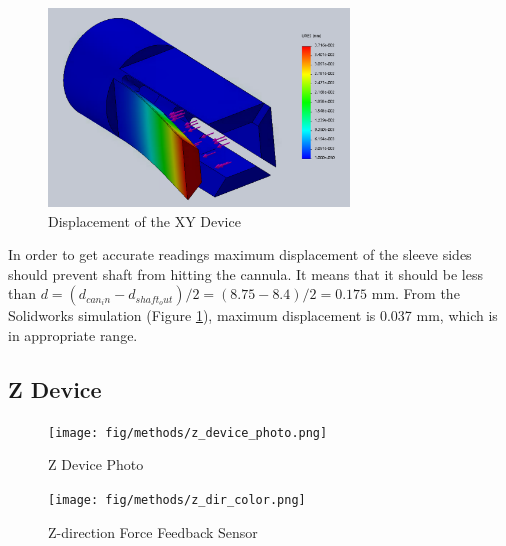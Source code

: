 \begin{figure}[h]
	\begin{center}
		\includegraphics[width=80mm]{fig/methods/old_sleeve_displ.png}
	\end{center}
	\vspace{-4mm}
	\caption[Displacement of the XY Device]
	{Displacement of the XY Device}
	\label{fig:xy-displ}
	\vspace{-2mm}
\end{figure}

In order to get accurate readings maximum displacement of the sleeve sides should prevent shaft from hitting the cannula. It means that it should be less than $d=(d_{can_in} - d_{shaft_out})/2 = (8.75 - 8.4)/2 = 0.175$ mm. From the Solidworks simulation (Figure \ref{fig:xy-displ}), maximum displacement is 0.037 mm, which is in appropriate range.

\subsection{Z Device}
\label{sec:zDir}

\begin{figure}[h]
	\begin{center}
		\texttt{[image: fig/methods/z\_device\_photo.png]}
	\end{center}
	\vspace{-4mm}
	\caption[Z Device]
	{Z Device Photo}
	\label{fig:z_photo}
	\vspace{-2mm}
\end{figure}

\begin{figure}[h]
	\begin{center}
		\texttt{[image: fig/methods/z\_dir\_color.png]}
	\end{center}
	\vspace{-4mm}
	\caption[Z-direction Force Feedback Sensor]
	{Z-direction Force Feedback Sensor}
	\label{fig:Z-direction}
	\vspace{-2mm}
\end{figure}

